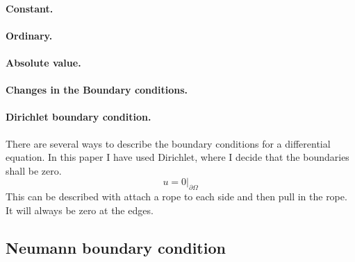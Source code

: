 \documentclass{book}
\begin{document}
\paragraph{Constant.}

\paragraph{Ordinary.}

\paragraph{Absolute value.}

\paragraph{Changes in the Boundary conditions.}

\paragraph{Dirichlet boundary condition.}
There are several ways to describe the boundary conditions for a differential equation.
In this paper I have used Dirichlet, where I decide that the boundaries shall be zero.
\begin{equation}
u = 0|_{\partial \Omega}
\end{equation}
This can be described with attach a rope to each side and then pull in the rope. It will always
be zero at the edges.

\subsection{Neumann boundary condition}
\end{document}
